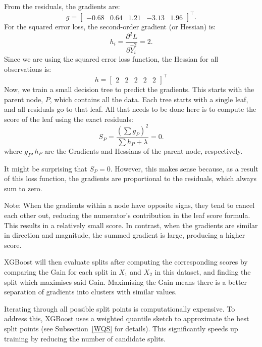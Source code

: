 \documentclass[11pt]{report} %
\begin{document}
From the residuals, the gradients are:
\[
g =
\begin{bmatrix}
-0.68 &
0.64 &
1.21 &
-3.13 &
1.96
\end{bmatrix}^\top.
\]
For the squared error loss, the second-order gradient (or Hessian) is:
\[
h_i = \frac{\partial^2 L}{\partial \hat{Y}_i^2} = 2.
\]
Since we are using the squared error loss function, the Hessian for all observations is:
\[
h =
\begin{bmatrix}
2 &
2 &
2 &
2 &
2
\end{bmatrix}^\top
\]
Now, we train a small decision tree to predict the gradients. This starts with the parent node, $P$, which contains all the data. Each tree starts with a single leaf, and all residuals go to that leaf.\cite{statquest2019} All that needs to be done here is to compute the score of the leaf using the exact residuals:
\[
S_P = \frac{(\sum g_P)^2}{\sum h_P + \lambda}=0.
\]
where $g_P, h_P$ are the Gradients and Hessians of the parent node, respectively. 

It might be surprising that $S_P=0$. However, this makes sense because, as a result of this loss function, the gradients are proportional to the residuals, which always sum to zero. 

\noindent Note: When the gradients within a node have opposite signs, they tend to cancel each other out, reducing the numerator's contribution in the leaf score formula. This results in a relatively small score. In contrast, when the gradients are similar in direction and magnitude, the summed gradient is large, producing a higher score.\cite{statquest2019}

XGBoost will then evaluate splits after computing the corresponding scores by comparing the Gain for each split in $X_1$ and $X_2$ in this dataset, and finding the split which maximises said Gain. Maximising the Gain means there is a better separation of gradients into clusters with similar values.\cite{statquest2019} 

Iterating through all possible split points is computationally expensive. To address this, XGBoost uses a weighted quantile sketch to approximate the best split points (see Subsection~\ref{WQS} for details). This significantly speeds up training by reducing the number of candidate splits.
\end{document}
